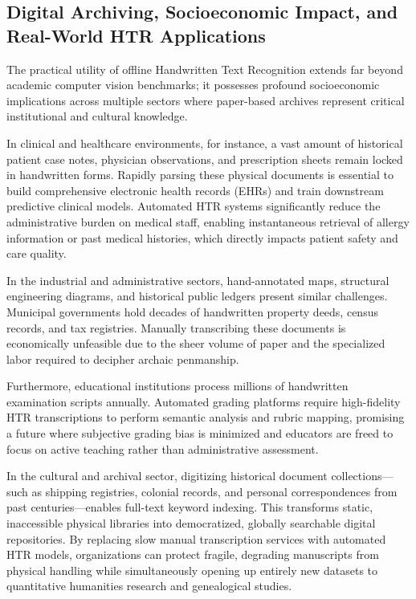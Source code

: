 \subsection{Digital Archiving, Socioeconomic Impact, and Real-World HTR Applications}
The practical utility of offline Handwritten Text Recognition extends far beyond academic computer vision benchmarks; it possesses profound socioeconomic implications across multiple sectors where paper-based archives represent critical institutional and cultural knowledge. 

In clinical and healthcare environments, for instance, a vast amount of historical patient case notes, physician observations, and prescription sheets remain locked in handwritten forms. Rapidly parsing these physical documents is essential to build comprehensive electronic health records (EHRs) and train downstream predictive clinical models. Automated HTR systems significantly reduce the administrative burden on medical staff, enabling instantaneous retrieval of allergy information or past medical histories, which directly impacts patient safety and care quality.

In the industrial and administrative sectors, hand-annotated maps, structural engineering diagrams, and historical public ledgers present similar challenges. Municipal governments hold decades of handwritten property deeds, census records, and tax registries. Manually transcribing these documents is economically unfeasible due to the sheer volume of paper and the specialized labor required to decipher archaic penmanship.

Furthermore, educational institutions process millions of handwritten examination scripts annually. Automated grading platforms require high-fidelity HTR transcriptions to perform semantic analysis and rubric mapping, promising a future where subjective grading bias is minimized and educators are freed to focus on active teaching rather than administrative assessment.

In the cultural and archival sector, digitizing historical document collections—such as shipping registries, colonial records, and personal correspondences from past centuries—enables full-text keyword indexing. This transforms static, inaccessible physical libraries into democratized, globally searchable digital repositories. By replacing slow manual transcription services with automated HTR models, organizations can protect fragile, degrading manuscripts from physical handling while simultaneously opening up entirely new datasets to quantitative humanities research and genealogical studies.


